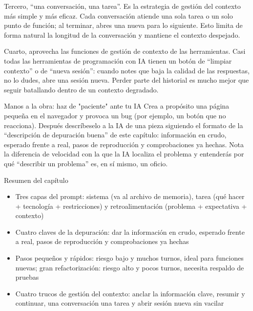 Tercero, “una conversación, una tarea”. Es la estrategia de gestión del contexto más simple y más eficaz. Cada conversación atiende una sola tarea o un solo punto de función; al terminar, abres una nueva para lo siguiente. Esto limita de forma natural la longitud de la conversación y mantiene el contexto despejado.

Cuarto, aprovecha las funciones de gestión de contexto de las herramientas. Casi todas las herramientas de programación con IA tienen un botón de “limpiar contexto” o de “nueva sesión”: cuando notes que baja la calidad de las respuestas, no lo dudes, abre una sesión nueva. Perder parte del historial es mucho mejor que seguir batallando dentro de un contexto degradado.

\begin{tcbpractice}{Manos a la obra: haz de "paciente" ante tu IA}
Crea a propósito una página pequeña en el navegador y provoca un bug (por ejemplo, un botón que no reacciona). Después descríbeselo a la IA de una pieza siguiendo el formato de la “descripción de depuración buena” de este capítulo: información en crudo, esperado frente a real, pasos de reproducción y comprobaciones ya hechas. Nota la diferencia de velocidad con la que la IA localiza el problema y entenderás por qué “describir un problema” es, en sí mismo, un oficio.

\end{tcbpractice}

\begin{tcbsummary}{Resumen del capítulo}
\begin{itemize}
  \item Tres capas del prompt: sistema (va al archivo de memoria), tarea (qué hacer + tecnología + restricciones) y retroalimentación (problema + expectativa + contexto)
  \item Cuatro claves de la depuración: dar la información en crudo, esperado frente a real, pasos de reproducción y comprobaciones ya hechas
  \item Pasos pequeños y rápidos: riesgo bajo y muchos turnos, ideal para funciones nuevas; gran refactorización: riesgo alto y pocos turnos, necesita respaldo de pruebas
  \item Cuatro trucos de gestión del contexto: anclar la información clave, resumir y continuar, una conversación una tarea y abrir sesión nueva sin vacilar
\end{itemize}

\end{tcbsummary}
